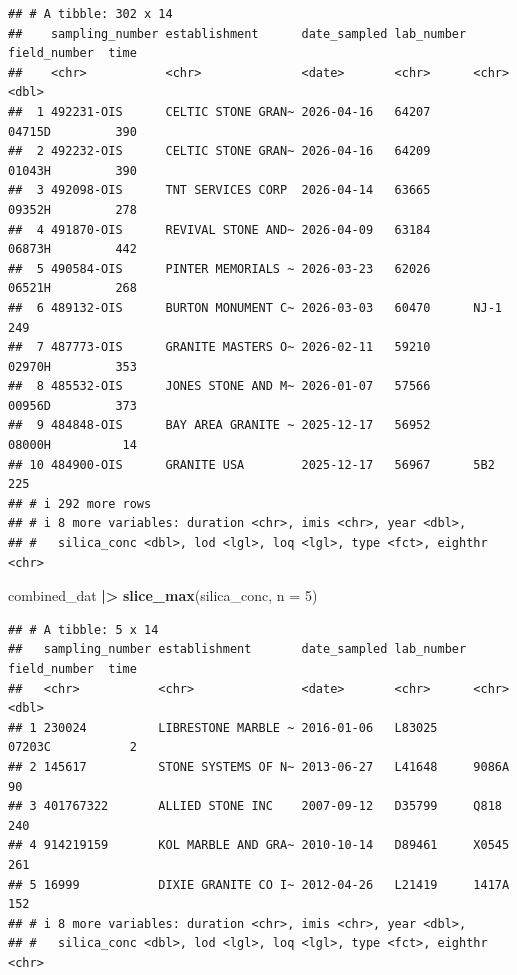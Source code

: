 \documentclass[
]{article}
\newenvironment{Shaded}{\begin{snugshade}}{\end{snugshade}}
\newcommand{\AttributeTok}[1]{\textcolor[rgb]{0.13,0.29,0.53}{#1}}
\newcommand{\DecValTok}[1]{\textcolor[rgb]{0.00,0.00,0.81}{#1}}
\newcommand{\FunctionTok}[1]{\textcolor[rgb]{0.13,0.29,0.53}{\textbf{#1}}}
\newcommand{\NormalTok}[1]{#1}
\newcommand{\SpecialCharTok}[1]{\textcolor[rgb]{0.81,0.36,0.00}{\textbf{#1}}}
\begin{document}
\begin{verbatim}
## # A tibble: 302 x 14
##    sampling_number establishment      date_sampled lab_number field_number  time
##    <chr>           <chr>              <date>       <chr>      <chr>        <dbl>
##  1 492231-OIS      CELTIC STONE GRAN~ 2026-04-16   64207      04715D         390
##  2 492232-OIS      CELTIC STONE GRAN~ 2026-04-16   64209      01043H         390
##  3 492098-OIS      TNT SERVICES CORP  2026-04-14   63665      09352H         278
##  4 491870-OIS      REVIVAL STONE AND~ 2026-04-09   63184      06873H         442
##  5 490584-OIS      PINTER MEMORIALS ~ 2026-03-23   62026      06521H         268
##  6 489132-OIS      BURTON MONUMENT C~ 2026-03-03   60470      NJ-1           249
##  7 487773-OIS      GRANITE MASTERS O~ 2026-02-11   59210      02970H         353
##  8 485532-OIS      JONES STONE AND M~ 2026-01-07   57566      00956D         373
##  9 484848-OIS      BAY AREA GRANITE ~ 2025-12-17   56952      08000H          14
## 10 484900-OIS      GRANITE USA        2025-12-17   56967      5B2            225
## # i 292 more rows
## # i 8 more variables: duration <chr>, imis <chr>, year <dbl>,
## #   silica_conc <dbl>, lod <lgl>, loq <lgl>, type <fct>, eighthr <chr>
\end{verbatim}

\begin{Shaded}
\begin{Highlighting}[]
\NormalTok{combined\_dat }\SpecialCharTok{|\textgreater{}} 
  \FunctionTok{slice\_max}\NormalTok{(silica\_conc, }\AttributeTok{n =} \DecValTok{5}\NormalTok{)}
\end{Highlighting}
\end{Shaded}

\begin{verbatim}
## # A tibble: 5 x 14
##   sampling_number establishment       date_sampled lab_number field_number  time
##   <chr>           <chr>               <date>       <chr>      <chr>        <dbl>
## 1 230024          LIBRESTONE MARBLE ~ 2016-01-06   L83025     07203C           2
## 2 145617          STONE SYSTEMS OF N~ 2013-06-27   L41648     9086A           90
## 3 401767322       ALLIED STONE INC    2007-09-12   D35799     Q818           240
## 4 914219159       KOL MARBLE AND GRA~ 2010-10-14   D89461     X0545          261
## 5 16999           DIXIE GRANITE CO I~ 2012-04-26   L21419     1417A          152
## # i 8 more variables: duration <chr>, imis <chr>, year <dbl>,
## #   silica_conc <dbl>, lod <lgl>, loq <lgl>, type <fct>, eighthr <chr>
\end{verbatim}
\end{document}
